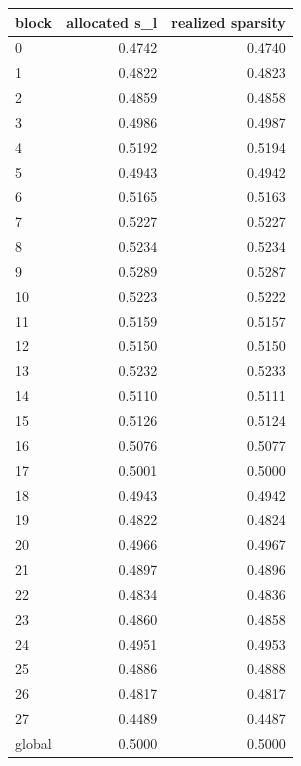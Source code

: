 \begin{tabular}{lrr}
\toprule
block & allocated s\_l & realized sparsity \\
\midrule
0 & 0.4742 & 0.4740 \\
1 & 0.4822 & 0.4823 \\
2 & 0.4859 & 0.4858 \\
3 & 0.4986 & 0.4987 \\
4 & 0.5192 & 0.5194 \\
5 & 0.4943 & 0.4942 \\
6 & 0.5165 & 0.5163 \\
7 & 0.5227 & 0.5227 \\
8 & 0.5234 & 0.5234 \\
9 & 0.5289 & 0.5287 \\
10 & 0.5223 & 0.5222 \\
11 & 0.5159 & 0.5157 \\
12 & 0.5150 & 0.5150 \\
13 & 0.5232 & 0.5233 \\
14 & 0.5110 & 0.5111 \\
15 & 0.5126 & 0.5124 \\
16 & 0.5076 & 0.5077 \\
17 & 0.5001 & 0.5000 \\
18 & 0.4943 & 0.4942 \\
19 & 0.4822 & 0.4824 \\
20 & 0.4966 & 0.4967 \\
21 & 0.4897 & 0.4896 \\
22 & 0.4834 & 0.4836 \\
23 & 0.4860 & 0.4858 \\
24 & 0.4951 & 0.4953 \\
25 & 0.4886 & 0.4888 \\
26 & 0.4817 & 0.4817 \\
27 & 0.4489 & 0.4487 \\
global & 0.5000 & 0.5000 \\
\bottomrule
\end{tabular}
